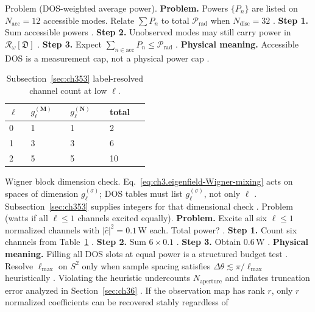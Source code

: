 Problem (DOS-weighted average power). \textbf{Problem.} Powers \(\{P_{n}\}\) are listed on \(N_{\mathrm{acc}}=12\) accessible modes. Relate \(\sum P_{n}\) to total
\(\mathcal{P}_{\mathrm{rad}}\) when \(N_{\mathrm{disc}}=32\) \cite{harrington2001}.
\textbf{Step 1.} Sum accessible powers \cite{poynting1884}.
\textbf{Step 2.} Unobserved modes may still carry power in \(\mathcal{R}_\omega[\mathfrak{D}]\) \cite{harrington2001}.
\textbf{Step 3.} Expect \(\sum_{n\in\mathrm{acc}}P_{n}\le\mathcal{P}_{\mathrm{rad}}\) \cite{stratton1941}.
\textbf{Physical meaning.} Accessible DOS is a measurement cap, not a physical power cap \cite{harrington2001}.
\begin{table}[t]
\centering
\caption{Subsection~\ref{sec:ch353} label-resolved channel count at low \(\ell\).}
\label{tab:ch3.353-lowell-channel-count}
\small
\begin{tabular}{@{}p{0.12\linewidth}p{0.22\linewidth}p{0.22\linewidth}p{0.22\linewidth}@{}}
\toprule
\(\ell\) & \(g_{\ell}^{(\mathbf{M})}\) & \(g_{\ell}^{(\mathbf{N})}\) & total \\
\midrule
0 & 1 & 1 & 2 \\
1 & 3 & 3 & 6 \\
2 & 5 & 5 & 10 \\
\bottomrule
\end{tabular}
\end{table}
Wigner block dimension check. Eq.~\eqref{eq:ch3.eigenfield-Wigner-mixing} acts on spaces of dimension \(g_{\ell}^{(\sigma)}\); DOS tables must list
\(g_{\ell}^{(\sigma)}\), not only \(\ell\) \cite{jackson1999}. Subsection~\ref{sec:ch353} supplies integers for
that dimensional check \cite{stratton1941}.
Problem (watts if all \(\ell\le1\) channels excited equally). \textbf{Problem.} Excite all six \(\ell\le1\) normalized channels with \(|\widehat{c}|^{2}=0.1\,\mathrm{W}\) each. Total power?
\cite{harrington2001}.
\textbf{Step 1.} Count six channels from Table~\ref{tab:ch3.353-lowell-channel-count} \cite{hansen1988}.
\textbf{Step 2.} Sum \(6\times0.1\) \cite{poynting1884}.
\textbf{Step 3.} Obtain \(0.6\,\mathrm{W}\) \cite{harrington2001}.
\textbf{Physical meaning.} Filling all DOS slots at equal power is a structured budget test \cite{stratton1941}.
Resolve \(\ell_{\max}\) on \(S^{2}\) only when sample spacing satisfies \(\Delta\theta\lesssim\pi/\ell_{\max}\) heuristically
\cite{harrington2001}. Violating the heuristic undercounts \(N_{\mathrm{aperture}}\) and inflates truncation error
analyzed in Section~\ref{sec:ch36} \cite{hansen1988}.
If the observation map has rank \(r\), only \(r\) normalized coefficients can be recovered stably regardless of
